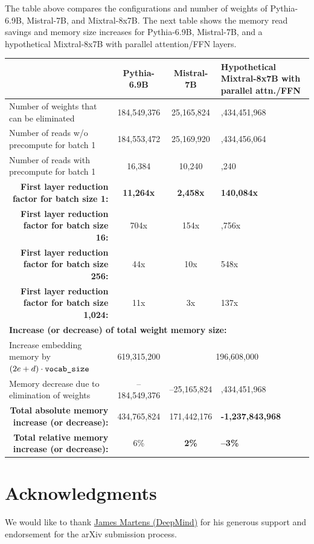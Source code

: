 \documentclass{article}
\begin{document}
The table above compares the configurations and number of weights of Pythia-6.9B, Mistral-7B, and Mixtral-8x7B. The next table shows the memory read savings and memory size increases for Pythia-6.9B, Mistral-7B, and a hypothetical Mixtral-8x7B with parallel attention/FFN layers.

\begingroup
\renewcommand{\arraystretch}{1.4} %
\begin{center} \begin{tabular}{|l|c|c|>{\centering\arraybackslash}m{7.8em}|}                                           \hline
  & \textbf{Pythia-6.9B} & \textbf{Mistral-7B} & \textbf{Hypothetical Mixtral-8x7B with parallel attn./FFN}         \\ \hline
  Number of weights that can be eliminated     & 184,549,376 & 25,165,824 & 1,434,451,968                           \\ \hline
  Number of reads w/o precompute for batch 1   & 184,553,472 & 25,169,920 & 1,434,456,064                           \\ \hline
  Number of reads with precompute for batch 1  & 16,384      & 10,240     & 10,240                                  \\ \hline
  \multicolumn{1}{|r|}{\textbf{First layer reduction factor for batch size 1:}} & \textbf{11,264x} & \textbf{2,458x} & \textbf{140,084x} \\ \hline
  \multicolumn{1}{|r|}{\textbf{First layer reduction factor for batch size 16:}}    & 704x    & 154x   & 8,756x     \\ \hline
  \multicolumn{1}{|r|}{\textbf{First layer reduction factor for batch size 256:}}   & 44x     & 10x    & 548x       \\ \hline
  \multicolumn{1}{|r|}{\textbf{First layer reduction factor for batch size 1,024:}} & 11x     & 3x     & 137x       \\ \hline

  \multicolumn{4}{|l|}{\textbf{Increase (or decrease) of total weight memory size:}}                                \\ \hline
  Increase embedding memory by $(2e + d) \cdot \verb+vocab_size+$ & 619,315,200 & \multicolumn{2}{c|}{196,608,000}  \\ \hline
  Memory decrease due to elimination of weights & –184,549,376 &  –25,165,824  & -1,434,451,968                     \\ \hline
  \multicolumn{1}{|r|}{\textbf{Total absolute memory increase (or decrease):}} & 434,765,824 & 171,442,176 & \textbf{-1,237,843,968} \\ \hline
  \multicolumn{1}{|r|}{\textbf{Total relative memory increase (or decrease):}} & 6\% & \textbf{2\%} & \textbf{–3\%} \\ \hline
\end{tabular} \end{center}
\endgroup

\section*{Acknowledgments}
We would like to thank \href{https://scholar.google.com/citations?user=LlK_saMAAAAJ&hl=en}{James Martens (DeepMind)} for his generous support and endorsement for the arXiv submission process.



\end{document}
